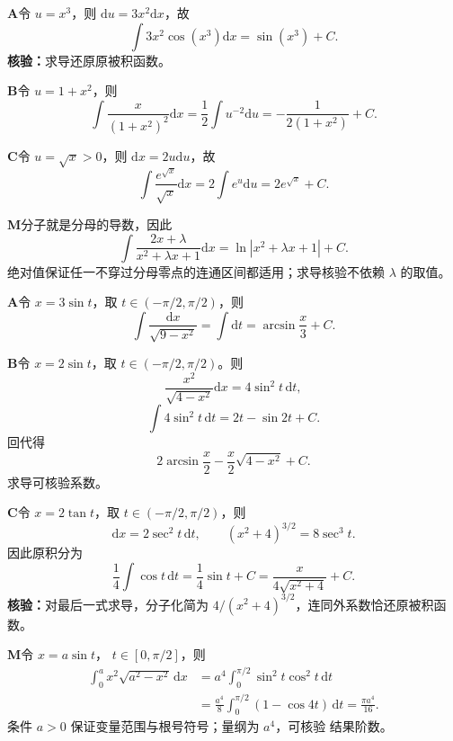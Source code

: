 \begin{solutionBox}
\textbf{A}\quad 令 \(u=x^3\)，则 \(\mathrm du=3x^2\mathrm dx\)，故
\[
\int3x^2\cos(x^3)\mathrm dx=\sin(x^3)+C.
\]
\textbf{核验：}求导还原原被积函数。
\end{solutionBox}
\begin{solutionBox}
\textbf{B}\quad 令 \(u=1+x^2\)，则
\[
\int\frac{x}{(1+x^2)^2}\mathrm dx
=\frac12\int u^{-2}\mathrm du
=-\frac1{2(1+x^2)}+C.
\]
\end{solutionBox}
\begin{solutionBox}
\textbf{C}\quad 令 \(u=\sqrt x>0\)，则
\(\mathrm dx=2u\mathrm du\)，故
\[
\int\frac{e^{\sqrt x}}{\sqrt x}\mathrm dx
=2\int e^u\mathrm du=2e^{\sqrt x}+C.
\]
\end{solutionBox}
\begin{solutionBox}
\textbf{M}\quad 分子就是分母的导数，因此
\[
\int\frac{2x+\lambda}{x^2+\lambda x+1}\mathrm dx
=\ln|x^2+\lambda x+1|+C.
\]
绝对值保证任一不穿过分母零点的连通区间都适用；求导核验不依赖
\(\lambda\) 的取值。
\end{solutionBox}

\begin{solutionBox}
\textbf{A}\quad 令 \(x=3\sin t\)，取
\(t\in(-\pi/2,\pi/2)\)，则
\[
\int\frac{\mathrm dx}{\sqrt{9-x^2}}
=\int\mathrm dt=\arcsin\frac x3+C.
\]
\end{solutionBox}
\begin{solutionBox}
\textbf{B}\quad 令 \(x=2\sin t\)，取
\(t\in(-\pi/2,\pi/2)\)。则
\[
\frac{x^2}{\sqrt{4-x^2}}\mathrm dx=4\sin^2t\,\mathrm dt,
\]
\[
\int4\sin^2t\,\mathrm dt
=2t-\sin2t+C.
\]
回代得
\[
\boxed{2\arcsin\frac x2-\frac{x}{2}\sqrt{4-x^2}+C}.
\]
求导可核验系数。
\end{solutionBox}
\begin{solutionBox}
\textbf{C}\quad 令 \(x=2\tan t\)，取
\(t\in(-\pi/2,\pi/2)\)，则
\[
\mathrm dx=2\sec^2t\,\mathrm dt,\qquad
(x^2+4)^{3/2}=8\sec^3t.
\]
因此原积分为
\[
\frac14\int\cos t\,\mathrm dt
=\frac14\sin t+C
=\frac{x}{4\sqrt{x^2+4}}+C.
\]
\textbf{核验：}对最后一式求导，分子化简为
\(4/(x^2+4)^{3/2}\)，连同外系数恰还原被积函数。
\end{solutionBox}
\begin{solutionBox}
\textbf{M}\quad 令 \(x=a\sin t\)，
\(t\in[0,\pi/2]\)，则
\[
\begin{aligned}
\int_0^a x^2\sqrt{a^2-x^2}\,\mathrm dx
&=a^4\int_0^{\pi/2}\sin^2t\cos^2t\,\mathrm dt\\
&=\frac{a^4}{8}\int_0^{\pi/2}(1-\cos4t)\,\mathrm dt
=\frac{\pi a^4}{16}.
\end{aligned}
\]
条件 \(a>0\) 保证变量范围与根号符号；量纲为 \(a^4\)，可核验
结果阶数。
\end{solutionBox}

